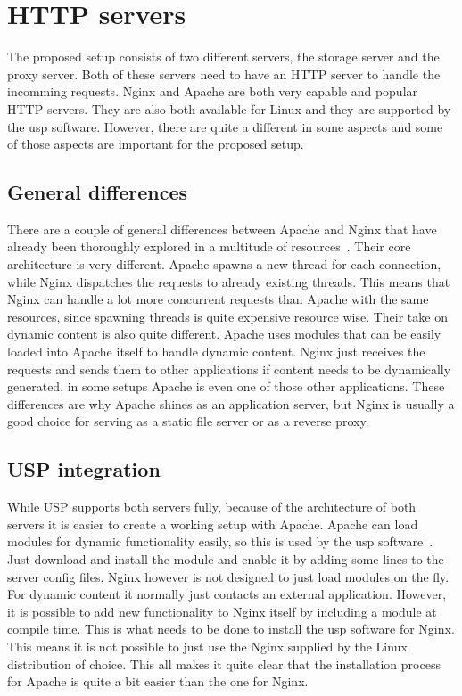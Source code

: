\documentclass[twoside,openright]{uva-bachelor-thesis}
\begin{document}
\section{HTTP servers}
The proposed setup consists of two different servers, the storage server and the
proxy server. Both of these servers need to have an HTTP server to handle the
incomming requests. Nginx and Apache are both very capable and popular HTTP
servers. They are also both available for Linux and they are supported by the
\gls{usp} software. However, there are quite a different in some aspects and some
of those aspects are important for the proposed setup.


\subsection{General differences}
There are a couple of general differences between Apache and Nginx that have
already been thoroughly explored in a multitude of
resources~\autocites{nginx1}{nginx2}{apachevsnginx}{nginxperformancescale}.
Their core architecture is very different. Apache spawns a new thread for each
connection, while Nginx dispatches the requests to already existing threads.
This means that Nginx can handle a lot more concurrent requests than Apache with
the same resources, since spawning threads is quite expensive resource wise.
Their take on dynamic content is also quite different. Apache uses modules that
can be easily loaded into Apache itself to handle dynamic content.  Nginx just
receives the requests and sends them to other applications if content needs to
be dynamically generated, in some setups Apache is even one of those other
applications. These differences are why Apache shines as an application server,
but Nginx is usually a good choice for serving as a static file server or as a
reverse proxy.


\subsection{USP integration}
While USP supports both servers fully, because of the architecture of both
servers it is easier to create a working setup with Apache. Apache can load
modules for dynamic functionality easily, so this is used by the \gls{usp}
software~\autocite{uspapache}. Just download and install the module
and enable it by adding some lines to the server config files. Nginx however is
not designed to just load modules on the fly. For dynamic content it normally
just contacts an external application. However, it is possible to add new
functionality to Nginx itself by including a module at compile time. This is
what needs to be done to install the \gls{usp} software for Nginx. This means
it is not possible to just use the Nginx supplied by the Linux distribution of
choice. This all makes it quite clear that the installation process for Apache
is quite a bit easier than the one for Nginx.
\end{document}
